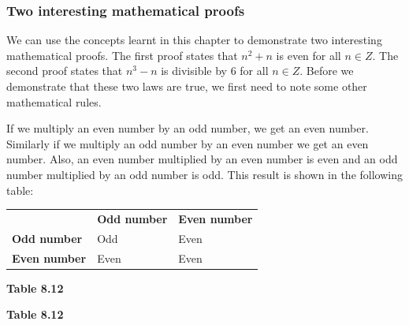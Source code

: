             \subsubsection{ Two interesting mathematical proofs}
            \nopagebreak
            \label{m39392*id76534}We can use the concepts learnt in this chapter to demonstrate two interesting mathematical proofs. The first proof states that ${n}^{2}+n$ is even for all $n\in {Z}$. The second proof states that ${n}^{3}-n$ is divisible by 6 for all $n\in {Z}$. Before we demonstrate that these two laws are true, we first need to note some other mathematical rules.
\par 
\label{m39392*id736}If we multiply an even number by an odd number, we get an even number. Similarly if we multiply an odd number by an even number we get an even number. Also, an even number multiplied by an even number is even and an odd number multiplied by an odd number is odd. This result is shown in the following table:
\par 
          \begin{table}[H]
        \begin{center}
      \label{m39392*eip-556}
    \noindent
      \tablelasttail{}
      \begin{xtabular}[t]{|l|l|l|}\hline
         &
        \textbf{Odd number} &
        \textbf{Even number}%
     \tabularnewline{}
        \textbf{Odd number} &
        Odd &
        Even%
     \tabularnewline{}
        \textbf{Even number} &
        Even &
        Even%
     \tabularnewline{}
    \end{xtabular}
      \end{center}
    \begin{center}{\small\bfseries Table 8.12}\end{center}
    \begin{caption}{\small\bfseries Table 8.12}\end{caption}
\end{table}
